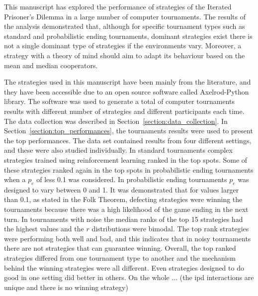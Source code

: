 \documentclass{article}
\newcommand{\numberofalltournaments}{}
\newcommand{\numberofstrategies}{}
\begin{document}
This manuscript has explored the performance of \numberofstrategies strategies of the Iterated
Prisoner's Dilemma in a large number of computer tournaments. The results of
the analysis demonstrated that, although for specific tournament types such as
standard and probabilistic ending tournaments, dominant strategies exist
there is not a single dominant type of strategies if the environments
vary. Moreover, a strategy with a theory of mind should aim to adapt its behaviour
based on the mean and median cooperators.

The \numberofstrategies strategies used in this manuscript have been mainly from
the literature, and they have been accessible due to an open source software
called Axelrod-Python library. The software was used to generate a total of
\numberofalltournaments computer tournaments results with different number of
strategies and different participants each time. The data collection was
described in Section~\ref{section:data_collection}. In
Section~\ref{section:top_performances}, the tournaments results were used to
present the top performances. The data set contained results from four different
settings, and these were also studied individually. In standard tournaments
complex strategies trained using reinforcement learning ranked in the top spots.
Some of these strategies ranked again in the top spots in probabilistic
ending tournaments when a \(p_e\) of less 0.1 was considered. In probabilistic
ending tournaments \(p_e\) was designed to vary between 0 and 1. It was demonstrated
that for values larger than 0.1, as stated in the Folk Theorem, defecting strategies
were winning the tournaments because there was a high likelihood of the game
ending in the next turn. In tournaments with noise the median ranks of the top
15 strategies had the highest values and the \(r\) distributions were bimodal.
The top rank strategies were performing both well and bad, and this indicates
that in noisy tournaments there are not strategies that can guarantee winning.
Overall, the top ranked strategies differed from one tournament type to
another and the mechanism behind the winning strategies were all different.
Even strategies designed to do good in one setting did better in others.
On the whole ... (the ipd interactions are unique and there is no winning
strategy) %
\end{document}
